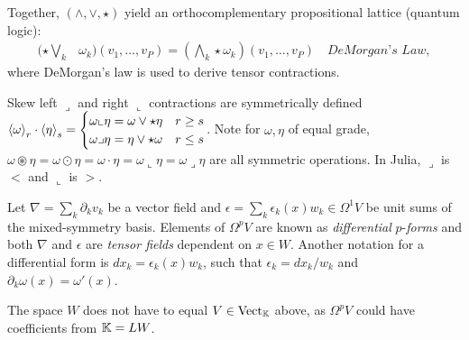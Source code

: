 \documentclass{juliacon}
\begin{document}
Together, $(\wedge,\vee,\star)$ yield an orthocomplementary propositional lattice (quantum logic):
\begin{align*}
	(\star\bigvee_k &\omega_k)(v_1,\dots,v_P) = (\bigwedge_k\star\omega_k)(v_1,\dots,v_P) \quad \textit{DeMorgan's Law},
\end{align*}
where DeMorgan's law is used to derive tensor contractions.
\begin{definition}
	Skew left $\lrcorner$ and right $\llcorner$ contractions are symmetrically defined
	$ \left\langle \omega \right\rangle_r\cdot\left\langle \eta \right\rangle_s = \begin{cases} \omega\llcorner\eta=\omega\vee\star\eta & r\geq s \\ \omega\lrcorner\eta=\eta\vee\star\omega & r\leq s \end{cases} $.
	Note for $\omega,\eta$ of equal grade, $\omega\circledast\eta = \omega\odot\eta = \omega\cdot\eta = \omega\llcorner\eta = \omega\lrcorner\eta$ are all symmetric operations. In Julia, $\lrcorner$ is $<$ and $\llcorner$ is $>$.
\end{definition}

\begin{definition}
	Let $\nabla = \sum_k\partial_kv_k$ be a vector field and $\epsilon = \sum_k\epsilon_k(x)w_k \in \Omega^1V$ be unit sums of the mixed-symmetry basis.
	Elements of $\Omega^pV$ are known as \textit{differential} $p$-\textit{forms} and both $\nabla$ and $\epsilon$ are \textit{tensor fields} dependent on $x\in W$.
	Another notation for a differential form is $dx_k = \epsilon_k(x)w_k$, such that $\epsilon_k = dx_k/w_k$ and $\partial_k\omega(x) = \omega'(x)$.
\end{definition}
\begin{remark}
	The space $W$ does not have to equal $V\in\text{Vect}_{\mathbb{K}}$ above, as $\Omega^pV$ could have coefficients from $\mathbb{K} = LW$.
\end{remark}
\end{document}
